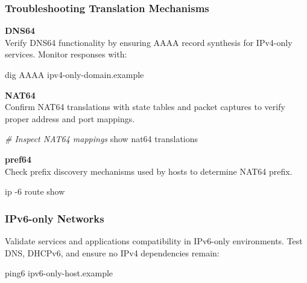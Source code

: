 \documentclass[
]{article}
\newenvironment{Shaded}{}{}
\newcommand{\AttributeTok}[1]{\textcolor[rgb]{0.49,0.56,0.16}{#1}}
\newcommand{\CommentTok}[1]{\textcolor[rgb]{0.38,0.63,0.69}{\textit{#1}}}
\newcommand{\ExtensionTok}[1]{#1}
\newcommand{\NormalTok}[1]{#1}
\begin{document}
\subsubsection{Troubleshooting Translation
Mechanisms}\label{troubleshooting-translation-mechanisms}

\textbf{DNS64}\\
Verify DNS64 functionality by ensuring AAAA record synthesis for
IPv4-only services. Monitor responses with:

\begin{Shaded}
\begin{Highlighting}[]
\ExtensionTok{dig}\NormalTok{ AAAA ipv4{-}only{-}domain.example}
\end{Highlighting}
\end{Shaded}

\textbf{NAT64}\\
Confirm NAT64 translations with state tables and packet captures to
verify proper address and port mappings.

\begin{Shaded}
\begin{Highlighting}[]
\CommentTok{\# Inspect NAT64 mappings}
\ExtensionTok{show}\NormalTok{ nat64 translations}
\end{Highlighting}
\end{Shaded}

\textbf{pref64}\\
Check prefix discovery mechanisms used by hosts to determine NAT64
prefix.

\begin{Shaded}
\begin{Highlighting}[]
\ExtensionTok{ip} \AttributeTok{{-}6}\NormalTok{ route show}
\end{Highlighting}
\end{Shaded}

\subsubsection{IPv6-only Networks}\label{ipv6-only-networks}

Validate services and applications compatibility in IPv6-only
environments. Test DNS, DHCPv6, and ensure no IPv4 dependencies remain:

\begin{Shaded}
\begin{Highlighting}[]
\ExtensionTok{ping6}\NormalTok{ ipv6{-}only{-}host.example}
\end{Highlighting}
\end{Shaded}
\end{document}
